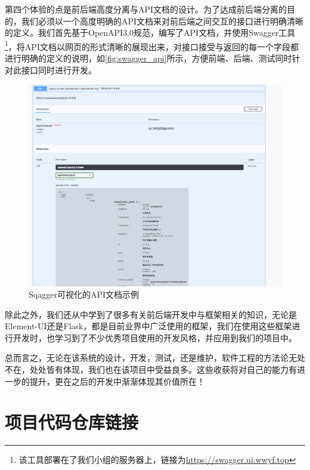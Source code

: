 第四个体验的点是前后端高度分离与API文档的设计。为了达成前后端分离的目的，我们必须以一个高度明确的API文档来对前后端之间交互的接口进行明确清晰的定义。我们首先基于OpenAPI3.0规范，编写了API文档，并使用Swagger工具\footnote{该工具部署在了我们小组的服务器上，链接为\url{https://swagger.ui.wwyf.top}}，将API文档以网页的形式清晰的展现出来，对接口接受与返回的每一个字段都进行明确的定义的说明，如\autoref{fig:swagger_api}所示，方便前端、后端、测试同时针对此接口同时进行开发。

\begin{figure}[htp]
    \centering
    \includegraphics[width=15cm]{report/figure/appendix2/swagger_api.png}
    \caption{Sqagger可视化的API文档示例}
    \label{fig:swagger_api}
\end{figure}

除此之外，我们还从中学到了很多有关前后端开发中与框架相关的知识，无论是Element-UI还是Flask，都是目前业界中广泛使用的框架，我们在使用这些框架进行开发时，也学习到了不少优秀项目使用的开发风格，并应用到我们的项目中。

总而言之，无论在该系统的设计，开发，测试，还是维护，软件工程的方法论无处不在，处处皆有体现，我们也在该项目中受益良多。这些收获将对自己的能力有进一步的提升，更在之后的开发中渐渐体现其价值所在！


\section{项目代码仓库链接}

